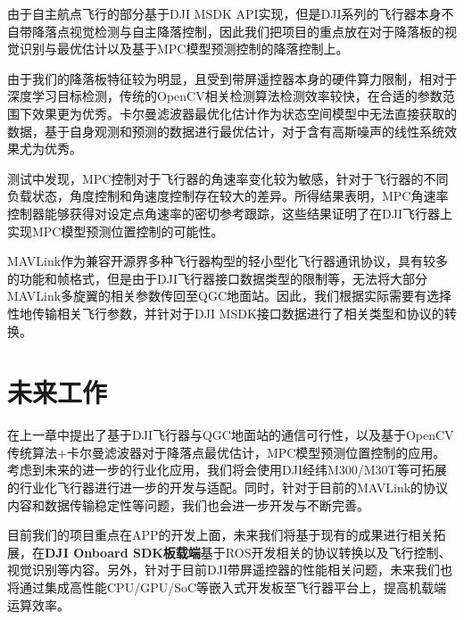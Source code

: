 由于自主航点飞行的部分基于DJI MSDK API实现，但是DJI系列的飞行器本身不自带降落点视觉检测与自主降落控制，因此我们把项目的重点放在对于降落板的视觉识别与最优估计以及基于MPC模型预测控制的降落控制上。

由于我们的降落板特征较为明显，且受到带屏遥控器本身的硬件算力限制，相对于深度学习目标检测，传统的OpenCV相关检测算法检测效率较快，在合适的参数范围下效果更为优秀。卡尔曼滤波器最优化估计作为状态空间模型中无法直接获取的数据，基于自身观测和预测的数据进行最优估计，对于含有高斯噪声的线性系统效果尤为优秀。

测试中发现，MPC控制对于飞行器的角速率变化较为敏感，针对于飞行器的不同负载状态，角度控制和角速度控制存在较大的差异。所得结果表明，MPC角速率控制器能够获得对设定点角速率的密切参考跟踪，这些结果证明了在DJI飞行器上实现MPC模型预测位置控制的可能性。

MAVLink作为兼容开源界多种飞行器构型的轻小型化飞行器通讯协议，具有较多的功能和帧格式，但是由于DJI飞行器接口数据类型的限制等，无法将大部分MAVLink多旋翼的相关参数传回至QGC地面站。因此，我们根据实际需要有选择性地传输相关飞行参数，并针对于DJI MSDK接口数据进行了相关类型和协议的转换。

\section{未来工作}

在上一章中提出了基于DJI飞行器与QGC地面站的通信可行性，以及基于OpenCV传统算法+卡尔曼滤波器对于降落点最优估计，MPC模型预测位置控制的应用。考虑到未来的进一步的行业化应用，我们将会使用DJI经纬M300/M30T等可拓展的行业化飞行器进行进一步的开发与适配。同时，针对于目前的MAVLink的协议内容和数据传输稳定性等问题，我们也会进一步开发与不断完善。

目前我们的项目重点在APP的开发上面，未来我们将基于现有的成果进行相关拓展，在\textbf{DJI Onboard SDK板载端}基于ROS开发相关的协议转换以及飞行控制、视觉识别等内容。另外，针对于目前DJI带屏遥控器的性能相关问题，未来我们也将通过集成高性能CPU/GPU/SoC等嵌入式开发板至飞行器平台上，提高机载端运算效率。
